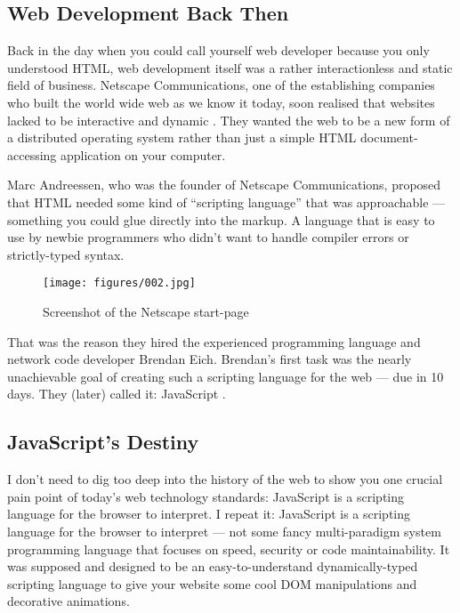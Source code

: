 \documentclass[10pt]{article}
\begin{document}
\begin{sloppypar}
  \subsection{Web Development Back Then}
  \label{sec:back-then}

  Back in the day when you could call yourself web developer because you only understood HTML, web development itself was a rather interactionless and static field of business. Netscape Communications, one of the establishing companies who built the world wide web as we know it today, soon realised that websites lacked to be interactive and dynamic \citep{cassel_brendan_2018}. They wanted the web to be a new form of a distributed operating system rather than just a simple HTML document-accessing application on your computer.

  Marc Andreessen, who was the founder of Netscape Communications, proposed that HTML needed some kind of “scripting language” that was approachable — something you could glue directly into the markup. A language that is easy to use by newbie programmers who didn’t want to handle compiler errors or strictly-typed syntax.

  \begin{figure}[ht]
    \centering
    \texttt{[image: figures/002.jpg]}
    \caption{Screenshot of the Netscape start-page \citep{npr_home_nodate}}
    \label{fig:netscape}
  \end{figure}

  That was the reason they hired the experienced programming language and network code developer Brendan Eich. Brendan’s first task was the nearly unachievable goal of creating such a scripting language for the web — due in 10 days. They (later) called it: JavaScript \citep{severance_javascript_2012}.

  \subsection{JavaScript’s Destiny}
  \label{sec:javascript-destiny}

  I don’t need to dig too deep into the history of the web to show you one crucial pain point of today’s web technology standards: JavaScript is a scripting language for the browser to interpret. I repeat it: JavaScript is a scripting language for the browser to interpret — not some fancy multi-paradigm system programming language that focuses on speed, security or code maintainability. It was supposed and designed to be an easy-to-understand dynamically-typed scripting language to give your website some cool DOM manipulations and decorative animations.


\end{sloppypar}
\end{document}
